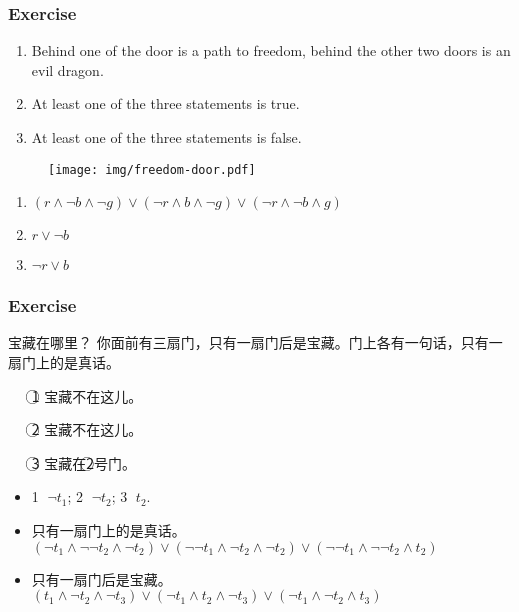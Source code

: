 \documentclass[UTF8,11pt,colorlinks,compress,openany]{beamer}%
\begin{document}
\begin{frame}\frametitle{Exercise}
\begin{enumerate}
	\item Behind one of the door is a path to freedom, behind the other two doors is an evil dragon.
	\item At least one of the three statements is true.
	\item At least one of the three statements is false.
\end{enumerate}
\begin{figure}
	\texttt{[image: img/freedom-door.pdf]}
\end{figure}
\begin{enumerate}
	\item $(r\wedge \neg b\wedge\neg g)\vee(\neg r\wedge b\wedge\neg g)\vee(\neg r\wedge \neg b\wedge g)$
	\item $r\vee\neg b$
	\item $\neg r\vee b$
\end{enumerate}
\end{frame}

\begin{frame}\frametitle{Exercise}
\begin{block}{宝藏在哪里？}
你面前有三扇门，只有一扇门后是宝藏。门上各有一句话，只有一扇门上的是真话。
\begin{enumerate}
	\item[\textcircled{\footnotesize 1}] 宝藏不在这儿。
	\item[\textcircled{\footnotesize 2}] 宝藏不在这儿。
	\item[\textcircled{\footnotesize 3}] 宝藏在\textcircled{\footnotesize 2}号门。
\end{enumerate}
\end{block}
\begin{itemize}
	\item \textcircled{\footnotesize 1} $\neg t_1$; \textcircled{\footnotesize 2} $\neg t_2$; \textcircled{\footnotesize 3} $t_2$.
	\item 只有一扇门上的是真话。
	$(\neg t_1\wedge\neg\neg t_2\wedge\neg t_2)\vee(\neg\neg t_1\wedge\neg t_2\wedge\neg t_2)\vee(\neg\neg t_1\wedge\neg\neg t_2\wedge t_2)$
	\item 只有一扇门后是宝藏。\\
	$(t_1\wedge\neg t_2\wedge\neg t_3)\vee(\neg t_1\wedge t_2\wedge\neg t_3)\vee(\neg t_1\wedge\neg t_2\wedge t_3)$
\end{itemize}
\end{frame}
\end{document}

